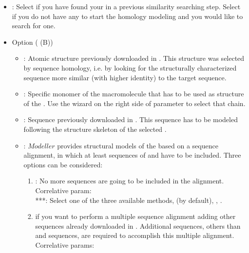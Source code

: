 \begin{itemize}
\begin{itemize}
                        \begin{itemize}
                        \item {}: Select  if you have found your  in a previous similarity searching step. Select  if you do not have any  to start the homology modeling and you would like to search for one.
                        \item Option  ( (B))
                                        \begin{itemize}
                                                \item {}: Atomic structure previously downloaded in \scipion. This structure was selected by sequence homology, i.e. by looking for the structurally characterized sequence more similar (with higher identity) to the target sequence.
                                                \item {}: Specific monomer of the macromolecule that has to be used as structure  of the . Use the wizard on the right side of  parameter to select that chain.
                                                \item {}: Sequence previously downloaded in \scipion. This sequence has to be modeled following the structure skeleton of the selected .
                                                \item {}: $Modeller$ provides structural models of the  based on a sequence alignment, in which at least sequences of  and  have to be included. Three options can be considered:
                                                \begin{enumerate}
                                                \item {}: No more sequences are going to be included in the alignment. Correlative param:\\
                                                     ***: Select one of the three available methods,  (by default), , .
                                                \item {} if you want to perform a multiple sequence alignment adding other sequences already downloaded in \scipion. Additional sequences, others than  and  sequences, are required to accomplish this multiple alignment. Correlative params:\\

\end{enumerate}
\end{itemize}
\end{itemize}
\end{itemize}
\end{itemize}
